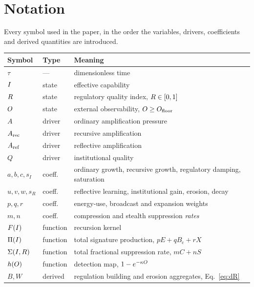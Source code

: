 \section{Notation}
\label{app:notation}

Every symbol used in the paper, in the order the variables, drivers,
coefficients and derived quantities are introduced.

\begin{center}
\small
\begin{tabular}{@{}llL{7.6cm}@{}}
\toprule
Symbol & Type & Meaning \\
\midrule
$\tau$        & --- & dimensionless time \\
$I$       & state & effective capability \\
$R$        & state & regulatory quality index, $R\in[0,1]$ \\
$O$        & state & external observability, $O\geq O_{\mathrm{floor}}$ \\
\midrule
$A$           & driver & ordinary amplification pressure \\
$A_{\mathrm{rec}}$       & driver & recursive amplification \\
$A_{\mathrm{ref}}$       & driver & reflective amplification \\
$Q$           & driver & institutional quality \\
\midrule
$a,b,c,s_I$   & coeff. & ordinary growth, recursive growth, regulatory damping, saturation \\
$u,v,w,s_R$   & coeff. & reflective learning, institutional gain, erosion, decay \\
$p,q,r$       & coeff. & energy-use, broadcast and expansion weights \\
$m,n$         & coeff. & compression and stealth suppression \emph{rates} \\
\midrule
$F(I)$    & function & recursion kernel \\
$\Pi(I)$  & function & total signature production, $pE+qB_{\mathrm c}+rX$ \\
$\Sigma(I,R)$ & function & total fractional suppression rate, $mC+nS$ \\
$h(O)$     & function & detection map, $1-e^{-\kappa O}$ \\
\midrule
$B, W$        & derived & regulation building and erosion aggregates, Eq.~\eqref{eq:dR} \\

\end{tabular}
\end{center}
